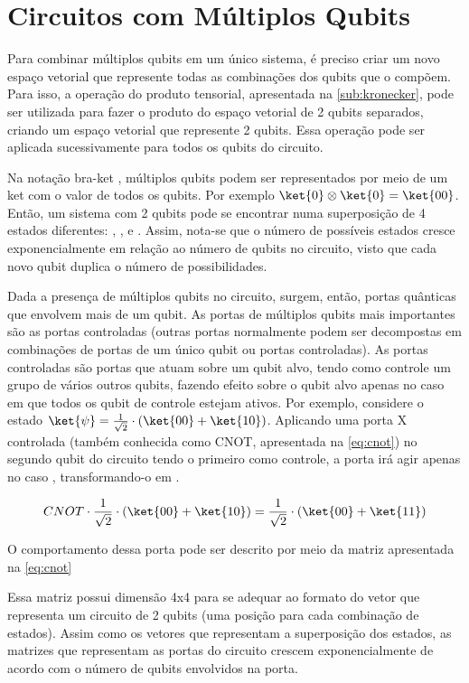 \section{Circuitos com Múltiplos Qubits}

Para combinar múltiplos qubits em um único sistema, é preciso criar um novo espaço vetorial que represente todas as combinações dos qubits que o compõem. Para isso, a operação do produto tensorial, apresentada na \cref{sub:kronecker}, pode ser utilizada para fazer o produto do espaço vetorial de 2 qubits separados, criando um espaço vetorial que represente 2 qubits. Essa operação pode ser aplicada sucessivamente para todos os qubits do circuito.

Na notação bra-ket \cite{Dirac_1939}, múltiplos qubits podem ser representados por meio de um ket com o valor de todos os qubits. Por exemplo $\ket{0} \otimes \ket{0} = \ket{00}$. Então, um sistema com 2 qubits pode se encontrar numa superposição de 4 estados diferentes: , ,  e . Assim, nota-se que o número de possíveis estados cresce exponencialmente em relação ao número de qubits no circuito, visto que cada novo qubit duplica o número de possibilidades.

Dada a presença de múltiplos qubits no circuito, surgem, então, portas quânticas que envolvem mais de um qubit. As portas de múltiplos qubits mais importantes são as portas controladas (outras portas normalmente podem ser decompostas em combinações de portas de um único qubit ou portas controladas). As portas controladas são portas que atuam sobre um qubit alvo, tendo como controle um grupo de vários outros qubits, fazendo efeito sobre o qubit alvo apenas no caso em que todos os qubit de controle estejam ativos. Por exemplo, considere o estado $\ket{\psi} = \frac{1}{\sqrt{2}} \cdot (\ket{00} + \ket{10})$. Aplicando uma porta X controlada (também conhecida como CNOT, apresentada na \cref{eq:cnot}) no segundo qubit do circuito tendo o primeiro como controle, a porta irá agir apenas no caso , transformando-o em .

\begin{equation}
  CNOT \cdot \frac{1}{\sqrt{2}} \cdot (\ket{00} + \ket{10}) = \frac{1}{\sqrt{2}} \cdot (\ket{00} + \ket{11})
\end{equation}

O comportamento dessa porta pode ser descrito por meio da matriz apresentada na \cref{eq:cnot}

Essa matriz possui dimensão 4x4 para se adequar ao formato do vetor que representa um circuito de 2 qubits (uma posição para cada combinação de estados). Assim como os vetores que representam a superposição dos estados, as matrizes que representam as portas do circuito crescem exponencialmente de acordo com o número de qubits envolvidos na porta.

